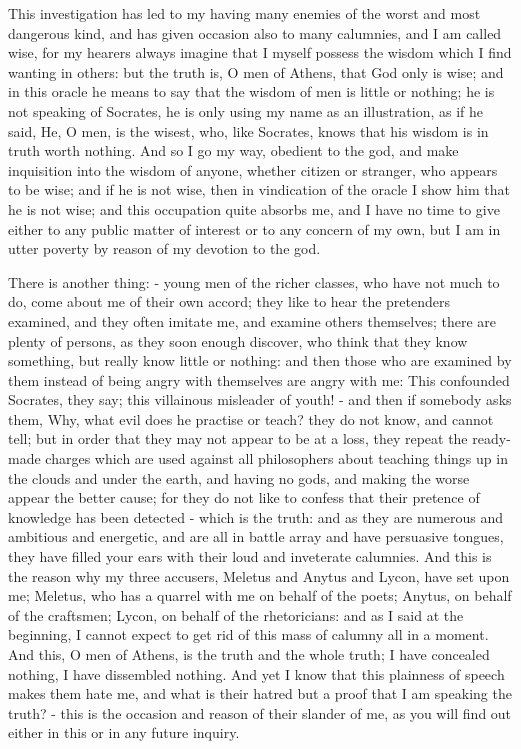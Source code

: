 This investigation has led to my having many enemies of the worst
and most dangerous kind, and has given occasion also to many calumnies,
and I am called wise, for my hearers always imagine that I myself
possess the wisdom which I find wanting in others: but the truth is,
O men of Athens, that God only is wise; and in this oracle he means
to say that the wisdom of men is little or nothing; he is not speaking
of Socrates, he is only using my name as an illustration, as if he
said, He, O men, is the wisest, who, like Socrates, knows that his
wisdom is in truth worth nothing. And so I go my way, obedient to
the god, and make inquisition into the wisdom of anyone, whether citizen
or stranger, who appears to be wise; and if he is not wise, then in
vindication of the oracle I show him that he is not wise; and this
occupation quite absorbs me, and I have no time to give either to
any public matter of interest or to any concern of my own, but I am
in utter poverty by reason of my devotion to the god. 

There is another thing: - young men of the richer classes, who have
not much to do, come about me of their own accord; they like to hear
the pretenders examined, and they often imitate me, and examine others
themselves; there are plenty of persons, as they soon enough discover,
who think that they know something, but really know little or nothing:
and then those who are examined by them instead of being angry with
themselves are angry with me: This confounded Socrates, they say;
this villainous misleader of youth! - and then if somebody asks them,
Why, what evil does he practise or teach? they do not know, and cannot
tell; but in order that they may not appear to be at a loss, they
repeat the ready-made charges which are used against all philosophers
about teaching things up in the clouds and under the earth, and having
no gods, and making the worse appear the better cause; for they do
not like to confess that their pretence of knowledge has been detected
- which is the truth: and as they are numerous and ambitious and energetic,
and are all in battle array and have persuasive tongues, they have
filled your ears with their loud and inveterate calumnies. And this
is the reason why my three accusers, Meletus and Anytus and Lycon,
have set upon me; Meletus, who has a quarrel with me on behalf of
the poets; Anytus, on behalf of the craftsmen; Lycon, on behalf of
the rhetoricians: and as I said at the beginning, I cannot expect
to get rid of this mass of calumny all in a moment. And this, O men
of Athens, is the truth and the whole truth; I have concealed nothing,
I have dissembled nothing. And yet I know that this plainness of speech
makes them hate me, and what is their hatred but a proof that I am
speaking the truth? - this is the occasion and reason of their slander
of me, as you will find out either in this or in any future inquiry.

